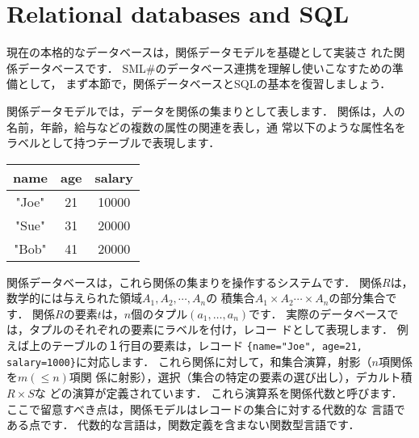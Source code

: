 \documentclass{jbook}
\newcommand{\txt}[2]{#2}
\newcommand{\smlsharp}{SML\#}
\begin{document}
\section{\txt{関係データベースとSQL}{Relational databases and SQL}}
\label{sec:tutorialRelationalModel}

\ifjp%
	現在の本格的なデータベースは，関係データモデルを基礎として実装さ
れた関係データベースです．
	\smlsharp{}のデータベース連携を理解し使いこなすための準備として，
まず本節で，関係データベースとSQLの基本を復習しましょう．

	関係データモデルでは，データを関係の集まりとして表します．
	関係は，人の名前，年齢，給与などの複数の属性の関連を表し，通
常以下のような属性名をラベルとして持つテーブルで表現します．

\begin{center}
\begin{tabular}{|c|c|c|}
\hline
name & age & salary
\\\hline
"Joe" & 21 & 10000
\\\hline
"Sue" & 31 & 20000
\\\hline
"Bob" & 41 & 20000
\\\hline
\end{tabular}
\end{center}

	関係データベースは，これら関係の集まりを操作するシステムです．
	関係$R$は，数学的には与えられた領域$A_1,A_2,\cdots,A_n$の
積集合$A_1\times A_2 \cdots \times A_n$の部分集合です．
	関係$R$の要素$t$は，$n$個のタプル$(a_1,\ldots,a_n)$です．
	実際のデータベースでは，タプルのそれぞれの要素にラベルを付け，レコー
ドとして表現します．
	例えば上のテーブルの１行目の要素は，レコード
{\tt \{name="Joe", age=21, salary=1000\}}に対応します．
	これら関係に対して，和集合演算，射影（$n$項関係を$m (\le n)$項関
係に射影），選択（集合の特定の要素の選び出し），デカルト積 $R\times S$な
どの演算が定義されています．
	これら演算系を関係代数と呼びます．
	ここで留意すべき点は，関係モデルはレコードの集合に対する代数的な
言語である点です．
	代数的な言語は，関数定義を含まない関数型言語です．
\end{document}
